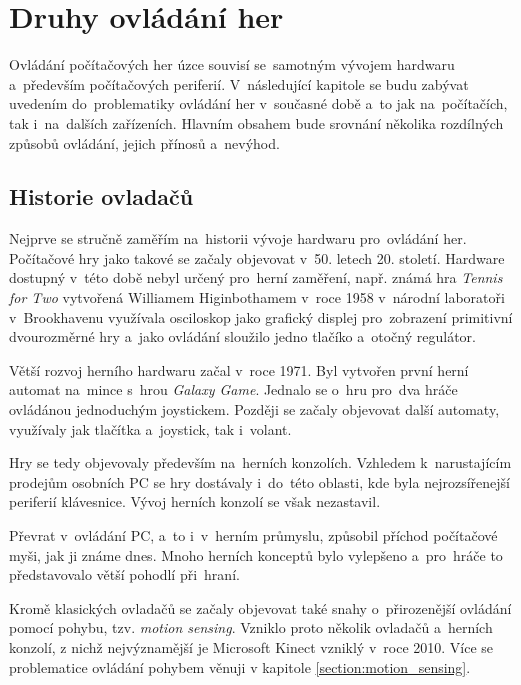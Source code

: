 \documentclass[thesis=B,czech,hidelinks]{FITthesis}[2012/06/26] %
\begin{document}
\chapter{Druhy ovládání her}

Ovládání počítačových her úzce souvisí se~samotným vývojem hardwaru a~především počítačových periferií. V~následující kapitole se budu zabývat uvedením do~problematiky ovládání her v~současné době a~to jak na~počítačích, tak i~na~dalších zařízeních. Hlavním obsahem bude srovnání několika rozdílných způsobů ovládání, jejich přínosů a~nevýhod. 


\section{Historie ovladačů}

Nejprve se stručně zaměřím na~historii vývoje hardwaru pro~ovládání her. Počítačové hry jako takové se začaly objevovat v~50. letech 20. století. Hardware dostupný v~této době nebyl určený pro~herní zaměření, např. známá hra \textit{Tennis for Two} vytvořená Williamem Higinbothamem v~roce 1958 v~národní laboratoři v~Brookhavenu využívala osciloskop jako grafický displej pro~zobrazení primitivní dvourozměrné hry a~jako ovládání sloužilo jedno tlačíko a~otočný regulátor.\cite{gamevshardware}

Větší rozvoj herního hardwaru začal v~roce 1971. Byl vytvořen první herní automat na~mince s~hrou \textit{Galaxy Game}. Jednalo se o~hru pro~dva hráče ovládánou jednoduchým joystickem. Později se začaly objevovat další automaty, využívaly jak tlačítka a~joystick, tak i~volant.

Hry se tedy objevovaly především na~herních konzolích. Vzhledem k~narustajícím prodejům osobních PC se hry dostávaly i~do~této oblasti, kde byla nejrozsířenejší periferií klávesnice. Vývoj herních konzolí se však nezastavil.

Převrat v~ovládání PC, a~to i~v~herním průmyslu, způsobil příchod počítačové myši, jak ji známe dnes. Mnoho herních konceptů bylo vylepšeno a~pro~hráče to představovalo větší pohodlí při~hraní. \cite{gamevshardware}

Kromě klasických ovladačů se začaly objevovat také snahy o~přirozenější ovládání pomocí pohybu, tzv. \textit{motion sensing}. Vzniklo proto několik ovladačů a~herních konzolí, z nichž nejvýznamější je Microsoft Kinect vzniklý v~roce 2010.\cite{wikicontrollers} Více se problematice ovládání pohybem věnuji v kapitole \ref{section:motion_sensing}.
\end{document}
